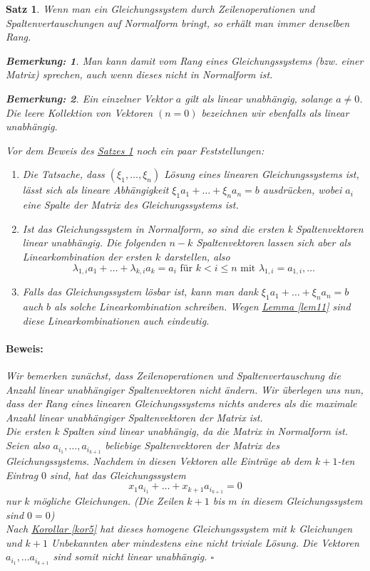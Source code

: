 \documentclass{report}
\newcommand{\lb}{\lambda}
\theoremstyle{customrem}
\newtheorem*{bem}{Bemerkung:}
\theoremstyle{customdef}
\newtheorem{satz}[definition]{Satz}
\renewenvironment{proof}{\vspace{-.75cm}\paragraph{Beweis: }}{\vspace{-.5cm}\hfill$\square$}
\begin{document}
	\begin{satz}
		\label{satz12}
		Wenn man ein Gleichungssystem durch Zeilenoperationen und Spaltenvertauschungen auf Normalform bringt, so erhält man immer denselben Rang.		
		\begin{bem}
			Man kann damit vom Rang eines Gleichungssystems (bzw. einer Matrix) sprechen, auch wenn dieses nicht in Normalform ist.
		\end{bem}
		\begin{bem}
			Ein einzelner Vektor $a$ gilt als linear unabhängig, solange $a \neq 0$. Die leere Kollektion von Vektoren $(n=0)$ bezeichnen wir ebenfalls als linear unabhängig.
		\end{bem}
		\noindent Vor dem Beweis des \hyperref[satz12]{Satzes \ref{satz12}} noch ein paar Feststellungen:
		\begin{enumerate}
			\item Die Tatsache, dass $(\xi_1, \dots, \xi_n)$ Lösung eines linearen Gleichungssystems ist, lässt sich als lineare Abhängigkeit 
			$\xi_1a_1 + \dots + \xi_n a_n = b$ ausdrücken, wobei $a_i$ eine Spalte der Matrix des Gleichungssystems ist.
			\item Ist das Gleichungssystem in Normalform, so sind die ersten k Spaltenvektoren linear unabhängig. Die folgenden $n-k$ Spaltenvektoren lassen sich aber als Linearkombination der ersten $k$ darstellen, also
			$$
			\lb_{1,i}a_1 + \dots + \lb_{k,i}a_k = a_i \text{ für } k < i \le n
			 \text{ mit }  \lb_{1,i} = a_{1,i}, \dots
			$$
			\item Falls das Gleichungssystem lösbar ist, kann man dank $\xi_1a_1 + \dots + \xi_n a_n = b$ auch $b$ als solche Linearkombination schreiben. Wegen \hyperref[lem11]{Lemma \ref{lem11}} sind diese Linearkombinationen auch eindeutig.
		\end{enumerate}
		\begin{proof}
			Wir bemerken zunächst, dass Zeilenoperationen und Spaltenvertauschung die Anzahl linear unabhängiger Spaltenvektoren nicht ändern.
			Wir überlegen uns nun, dass der Rang eines linearen Gleichungssystems nichts anderes als die maximale Anzahl linear unabhängiger Spaltenvektoren der Matrix ist.\\
			Die ersten k Spalten sind linear unabhängig, da die Matrix in Normalform ist. Seien also $a_{i_1}, \dots, a_{i_{k+1}}$ beliebige Spaltenvektoren der Matrix des Gleichungssystems. Nachdem in diesen Vektoren alle Einträge ab dem $k+1$-ten Eintrag $0$ sind, hat das Gleichungssystem \\
			$$
			x_1a_{i_1} + \dots + x_{k+1}a_{i_{k+1}} = 0
			$$
			nur $k$ mögliche Gleichungen. (Die Zeilen $k+1$ bis $m$ in diesem Gleichungssystem sind $0=0$)\\
			Nach \hyperref[kor5]{Korollar \ref{kor5}} hat dieses homogene Gleichungssystem mit $k$ Gleichungen und $k+1$ Unbekannten aber mindestens eine nicht triviale Lösung. Die Vektoren $a_{i_1}, \dots a_{i_{k+1}}$ sind somit nicht linear unabhängig.
		\end{proof}
	\end{satz}
	
\end{document}
